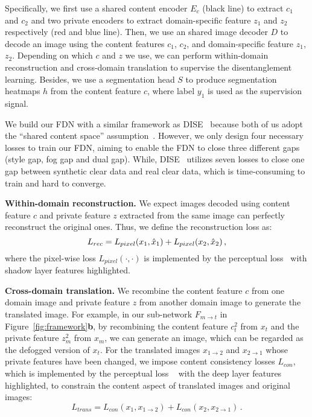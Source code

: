 \documentclass[10pt,twocolumn,letterpaper]{article}
\def\model{F}
\def\imd{m}
\def\td{t}
\newcommand{\heading}[1]{\noindent\textbf{#1}}
\begin{document}
Specifically, we first use a shared content encoder $E_{c}$ (black line) to extract $c_1$ and $c_2$ and two private encoders to extract domain-specific feature $z_1$ and $z_2$ respectively (red and blue line). Then, we use an shared image decoder $D$ to decode an image using the content features $c_{1}$, $c_{2}$, and domain-specific feature $z_{1}$, $z_{2}$. Depending on which $c$ and $z$ we use, we can perform within-domain reconstruction and cross-domain translation to supervise the disentanglement learning. Besides, we use a segmentation head $S$ to produce segmentation heatmaps $h$ from the content feature $c$, where label $y_{1}$ is used as the supervision signal.

We build our FDN with a similar framework as DISE~\cite{chang2019all} because  both of us adopt the ``shared content space'' assumption~\cite{huang2018multimodal}. However, we only design four necessary losses to train our FDN, aiming to enable the FDN to close three different gaps (style gap, fog gap and dual gap). While, DISE~\cite{chang2019all} utilizes seven losses to close one gap between synthetic clear data and real clear data, which is time-consuming to train and hard to converge.


\heading{Within-domain reconstruction.} 
We expect images decoded using content feature $c$ and private feature $z$ extracted from the same image can perfectly reconstruct the original ones. 
Thus, we define the reconstruction loss as:
\vspace{-1mm}
\begin{equation} 
{L}_{rec} =  {L}_{pixel}(x_{1}, \hat{x}_1) + {L}_{pixel}(x_{2}, \hat{x}_2)\,,
\vspace{-1mm}
\end{equation}
where the pixel-wise loss ${L}_{pixel}(\cdot, \cdot)$ is implemented by the perceptual loss~\cite{simonyan2014very} with shadow layer features highlighted. 


\heading{Cross-domain translation.} 
We recombine the content feature $c$ from one domain image and private feature $z$ from another domain image to generate the translated image.
For example, in our sub-network $\model_{\imd \rightarrow \td}$ in Figure~\ref{fig:framework}\textbf{b}, by recombining the content feature $c_t^2$ from $x_\td$ and the private feature $z_m^2$ from $x_\imd$, we can generate an image, which can be regarded as the defogged version of $x_\td$.
For the translated images ${x}_{1 \rightarrow 2}$ and ${x}_{2 \rightarrow 1}$ whose private features have been changed, we impose content consistency losses $L_{con}$, which is implemented by the perceptual loss ~\cite{simonyan2014very} with the deep layer features highlighted, to constrain the content aspect of translated images and original images:
\vspace{-1mm}
\begin{equation} 
{L}_{trans} =  {L}_{con}(x_{1}, {x}_{1 \rightarrow 2}) + {L}_{con}(x_{2}, {x}_{2 \rightarrow 1})\,.
\end{equation}
\end{document}
